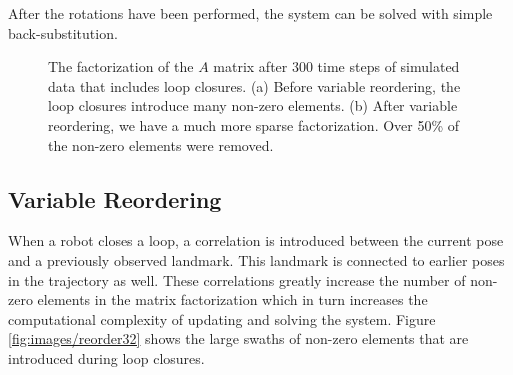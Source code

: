 \documentclass[conference]{IEEEtran}
\begin{document}
After the rotations have been performed, the system can be solved with simple back-substitution.

\begin{figure}[t]
  \begin{center}
    \caption{The factorization of the $A$ matrix after 300 time steps of simulated data
      that includes loop closures. (a) Before variable reordering, the loop closures
      introduce many non-zero elements. (b) After variable reordering, we have a much more
    sparse factorization. Over 50\% of the non-zero elements were removed.}
    \label{fig:reorder}
  \end{center}
\end{figure}

\subsection{Variable Reordering}
\label{sub:variablereordering}

When a robot closes a loop, a correlation is introduced between the current pose and a
previously observed landmark. This landmark is connected to earlier poses in the
trajectory as well. These correlations greatly increase the number of non-zero elements in
the matrix factorization which in turn increases the computational complexity of updating
and solving the system. Figure \ref{fig:images/reorder32} shows the large swaths of
non-zero elements that are introduced during loop closures. 
\end{document}
